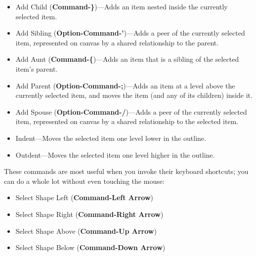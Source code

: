 \documentclass[../main.tex]{subfiles}
\begin{document}
\begin{description}[style=nextline]
    \begin{itemize}
    \item Add Child (\textbf{Command-\}})---Adds an item nested inside the currently selected
      item.
    \item Add Sibling (\textbf{Option-Command-'})---Adds a peer of the currently selected item,
      represented on canvas by a shared relationship to the parent.
    \item Add Aunt (\textbf{Command-\{})---Adds an item that is a sibling of the selected item's
        parent.
      \item Add Parent (\textbf{Option-Command-;})---Adds an item at a level above the currently
        selected item, and moves the item (and any of its children) inside it.
      \item Add Spouse (\textbf{Option-Command-/})---Adds a peer of the currently selected item,
        represented on canvas by a shared relationship to the selected item.
      \item Indent---Moves the selected item one level lower in the outline.
      \item Outdent---Moves the selected item one level higher in the outline.
    \end{itemize}
  \item[{Navigation (\textbf{Standard})}] These commands are most useful when you invoke their
    keyboard shortcuts; you can do a whole lot without even touching the mouse:

    \begin{itemize}
      \item Select Shape Left (\textbf{Command-Left Arrow})
      \item Select Shape Right (\textbf{Command-Right Arrow})
      \item Select Shape Above (\textbf{Command-Up Arrow})
      \item Select Shape Below (\textbf{Command-Down Arrow})
    \end{itemize}
\end{description}
\end{document}
